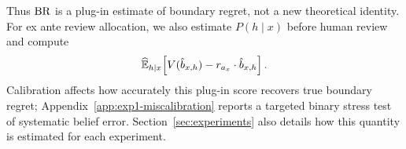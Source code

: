 Thus $\operatorname{BR}$ is a plug-in estimate of boundary regret, not a new theoretical identity.
For ex ante review allocation, we also estimate $P(h \mid x)$ before human review and compute
\begin{equation}
    \widehat{\mathbb{E}}_{h \mid x}\!\left[V(\hat{b}_{x,h}) - r_{a_x} \cdot \hat{b}_{x,h}\right].
\label{eq:ex-ante-brhat}
\end{equation}
Calibration affects how accurately this plug-in score recovers true boundary regret; Appendix~\ref{app:exp1-miscalibration} reports a targeted binary stress test of systematic belief error.
Section~\ref{sec:experiments} also details how this quantity is estimated for each experiment.
